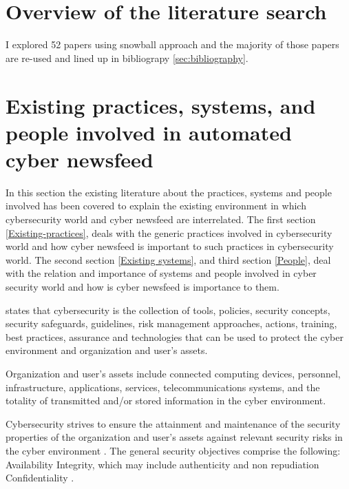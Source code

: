 \section{Overview of the literature search}
I explored 52 papers using snowball \citep{wohlin2014guidelines} approach and the majority of those papers are re-used and lined up in  bibliograpy \ref{sec:bibliography}. 



\section{Existing practices, systems, and people involved in automated cyber newsfeed}\label{Existing practices, systems, and people involved in automated cyber newsfeed}


In this section the existing literature about the practices, systems and people involved has been covered to explain the existing environment in which cybersecurity world and cyber newsfeed are interrelated. 
The first section \ref{Existing-practices},  deals with the generic practices involved in cybersecurity world and how cyber newsfeed is important to such practices in cybersecurity world. 
The second section \ref{Existing systems},  and third  section \ref{People},   deal with the relation and importance of systems and people involved in cyber security world and how is cyber newsfeed is importance to them. 

\cite{sector10itu} states that cybersecurity is the collection of tools, policies, security concepts, security safeguards, guidelines, risk management approaches, actions, training, best practices, assurance and technologies that can be used to protect the cyber environment and organization and user’s assets. 

Organization and user’s assets include connected computing devices, personnel, infrastructure, applications, services, telecommunications systems, and the totality of transmitted and/or stored information in the cyber environment.

Cybersecurity strives to ensure the attainment and maintenance of the security properties of the organization and user’s assets against relevant security risks in the cyber environment 
\citep{sector10itu}. 
The general security objectives comprise the following: Availability Integrity, which may include authenticity and non repudiation Confidentiality 
\citep{sector10itu}.



